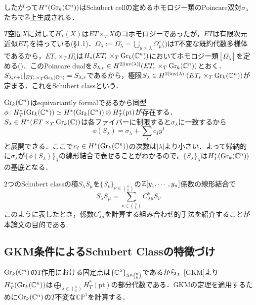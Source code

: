 したがって$H^*(\text{Gr}_k(\mathbb{C}^n))$はSchubert cellの定めるホモロジー類のPoincare双対$\sigma_\lambda$たちで$\mathbb{Z}$上生成される．

$T$空間$X$に対して$H^*_T(X)$は$ET\times_TX$のコホモロジーであったが，$ET$は有限次元近似$ET_r$を持っている(§1.1)．$\Omega_\lambda:=\overline{\Omega_\lambda^\circ}=\bigcup_{\mu\leq\lambda}\Omega_\mu^\circ$(\cite{fulton young tableaux})は$T$不変な既約代数多様体であるから，$ET_r\times_T\overline{\Omega_\lambda^\circ}$は$H_*(ET_r\times_T\text{Gr}_k(\mathbb{C}^n))$においてホモロジー類$[\Omega_\lambda]$を定める(\cite{fulton young tableaux})．このPoincare dualを$S_{\lambda,r}\in H^{2|\text{inv}(\lambda)|}(ET_r\times_T\text{Gr}_k(\mathbb{C}^n))$とおく．$S_{\lambda,r+1}|_{ET_r\times_T\text{Gr}_k(\mathbb{C}^n)} = S_{\lambda,r}$であるから，極限$S_\lambda\in H^{2|\text{inv}(\lambda)|}(ET_r\times_T\text{Gr}_k(\mathbb{C}^n))$が定まる．これをSchubert classという．

$\text{Gr}_k(\mathbb{C}^n)$はequivariantly formalであるから同型
$\phi\colon H^*_T(\text{Gr}_k(\mathbb{C}^n))\simeq H^*(\text{Gr}_k(\mathbb{C}^n))\otimes H^*_T(\text{pt})$が存在する．$S_\lambda\in H^*(ET\times_T\text{Gr}_k(\mathbb{C}))$は各ファイバーに制限すると$\sigma_\lambda$に一致するから
\[
\phi(S_\lambda) = \sigma_\lambda + \sum_{I}c_Iy^I
\]
と展開できる．ここで$c_I\in H^*(\text{Gr}_k(\mathbb{C}^n))$の次数は$|\lambda|$より小さい．よって帰納的に$\sigma_\lambda$が$\{\phi(S_\lambda)\}_\lambda$の線形結合で表せることがわかるので，$\{S_\lambda\}_\lambda$は$H^*_T(\text{Gr}_k(\mathbb{C}^n))$の基底となる．


$2$つのSchubert classの積$S_\lambda S_\mu$を$\{S_\nu\}_{\nu\in\binom{n}{k}}$の$\mathbb{Z}[y_1,\cdots,y_n]$係数の線形結合で
\begin{equation}\label{LRcoeff}
  S_\lambda S_\mu=\sum_{\nu\in\binom{n}{k}}C^\nu_{\lambda\mu}S_\nu
\end{equation}
このように表したとき，係数$C^{\nu}_{\lambda\mu}$を計算する組み合わせ的手法を紹介することが本論文の目的である.





\subsection{GKM条件によるSchubert Classの特徴づけ}

$\text{Gr}_k(\mathbb{C}^n)$の$T$作用における固定点は$\{\mathbb{C}^\lambda\}_{\lambda\in\binom{n}{k}}$であるから，[GKM]より$H^*_T(\text{Gr}_k(\mathbb{C}^n))$は$\bigoplus_{\lambda\in\binom{n}{k}}H^*_T(\text{pt})$の部分代数である．GKMの定理を適用するために$\text{Gr}_k(\mathbb{C}^n)$の$T$不変な$\mathbb{CP}^1$を計算する．

